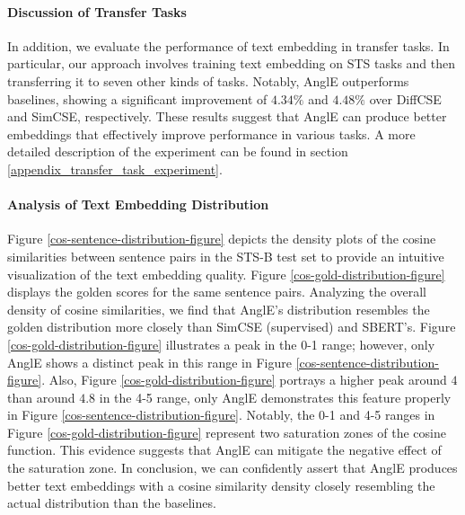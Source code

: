 \documentclass{article} \usepackage{iclr2024_conference,times}
\begin{document}
\paragraph{Discussion of Transfer Tasks}
\label{sec-transfer tasks}
In addition, we evaluate the performance of text embedding in transfer tasks. In particular, our approach involves training text embedding on STS tasks and then transferring it to seven other kinds of tasks. Notably, AnglE outperforms baselines, showing a significant improvement of $4.34\%$ and $4.48\%$ over DiffCSE and SimCSE, respectively. These results suggest that AnglE can produce better embeddings that effectively improve performance in various tasks. A more detailed description of the experiment can be found in section \ref{appendix_transfer_task_experiment}.


\paragraph{Analysis of Text Embedding Distribution}
Figure \ref{cos-sentence-distribution-figure} depicts the density plots of the cosine similarities between sentence pairs in the STS-B test set to provide an intuitive visualization of the text embedding quality. Figure \ref{cos-gold-distribution-figure} displays the golden scores for the same sentence pairs. Analyzing the overall density of cosine similarities, we find that AnglE's distribution resembles the golden distribution more closely than SimCSE (supervised) and SBERT's. Figure \ref{cos-gold-distribution-figure} illustrates a peak in the 0-1 range; however, only AnglE shows a distinct peak in this range in Figure \ref{cos-sentence-distribution-figure}. 
Also, Figure \ref{cos-gold-distribution-figure} portrays a higher peak around $4$ than around $4.8$ in the 4-5 range, only AnglE demonstrates this feature properly in Figure \ref{cos-sentence-distribution-figure}. 
Notably, the 0-1 and 4-5 ranges in Figure \ref{cos-gold-distribution-figure} represent two saturation zones of the cosine function. This evidence suggests that AnglE can mitigate the negative effect of the saturation zone. In conclusion, we can confidently assert that AnglE produces better text embeddings with a cosine similarity density closely resembling the actual distribution than the baselines.
\end{document}
